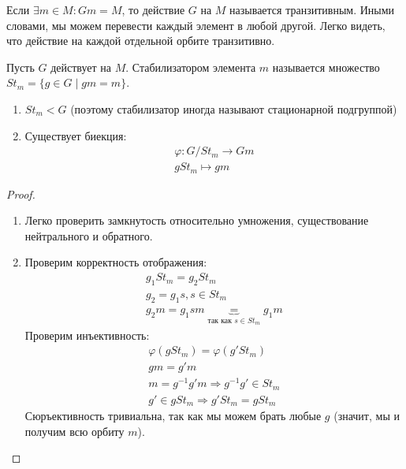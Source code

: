 Если $\exists m \in M : Gm = M$, то действие $G$ на $M$ называется транзитивным. 
Иными словами, мы можем перевести каждый элемент в любой другой. 
Легко видеть, что действие на каждой отдельной орбите транзитивно.

\begin{conj}
    Пусть $G$ действует на $M$. 
    Стабилизатором элемента $m$ называется множество $St_m = \{ g \in G \; | \; gm = m \}$.
\end{conj}

\begin{theorem-non} \quad 

    \begin{enumerate}
        \item $St_m < G$ (поэтому стабилизатор иногда называют стационарной подгруппой) 
        \item Существует биекция: 
        \begin{gather*}
            \varphi: G / St_m \to Gm \\
            gSt_m \mapsto gm
        \end{gather*}
    \end{enumerate}
\end{theorem-non}
\begin{proof} \quad \\
    \begin{enumerate}
        \item Легко проверить замкнутость относительно умножения, существование нейтрального и обратного.
        \item Проверим корректность отображения:
        \begin{gather*}
            g_1St_m = g_2St_m \\
            g_2 = g_1s, s \in St_m \\
            g_2m = g_1sm \underbrace{=}_{\text{так как } s \in St_m} g_1m
        \end{gather*}
        Проверим инъективность:
        \begin{gather*}
            \varphi(gSt_m) = \varphi(g'St_m) \\
            gm = g'm \\
            m = g^{-1}g'm \Rightarrow g^{-1}g' \in St_m \\
            g'\in gSt_m \Rightarrow g'St_m = gSt_m
        \end{gather*}
        Сюръективность тривиальна, так как мы можем брать любые $g$ (значит, мы и получим всю орбиту $m$).
    \end{enumerate}
\end{proof}

